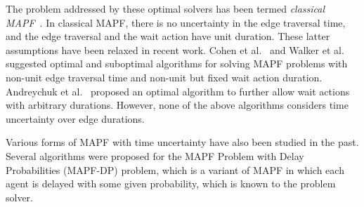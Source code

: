 \documentclass[jair,twoside,11pt,theapa]{article}
\begin{document}
The problem addressed by these optimal solvers has been termed \emph{classical MAPF}~. 
In classical MAPF, there is no uncertainty in the edge traversal time, and the edge traversal and the wait action have unit duration.
These latter assumptions have been relaxed in recent work.
Cohen et al.~\citeyear{cohen2019optimal}  and Walker et al.~\citeyear{walker2018extended,walker2020generalized} suggested optimal and suboptimal algorithms for solving MAPF problems with non-unit edge traversal time and non-unit but fixed wait action duration.
Andreychuk et al.~\citeyear{AndreychukYAS19} proposed an optimal algorithm to further allow wait actions with arbitrary durations.
However, none of the above algorithms considers time uncertainty over edge durations. 



Various forms of MAPF with time uncertainty have also been studied in the past. 
Several algorithms were proposed for the MAPF Problem with Delay Probabilities (MAPF-DP) problem, which is a variant of MAPF in which 
each agent is delayed with some given probability, which is known to the problem solver. 
\end{document}

